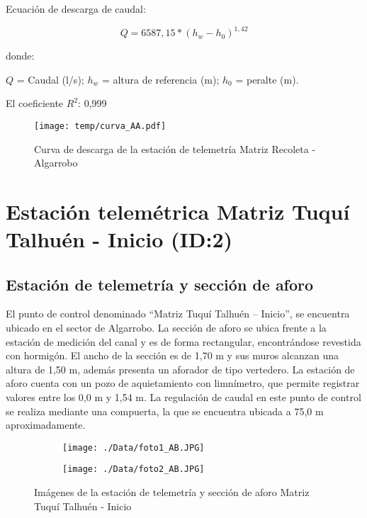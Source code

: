 \documentclass[]{article}
\begin{document}
Ecuación de descarga de caudal:

\[Q = 6587,15*(h_w - h_0)^{1,42}\]

donde:

\(Q\) = Caudal (l/s); \(h_w\) = altura de referencia (m); \(h_0\) =
peralte (m).

El coeficiente \(R^2\): 0,999

\begin{figure}[H]
  \centering
  \texttt{[image: temp/curva\_AA.pdf]}
\caption{Curva de descarga de la estación de telemetría Matriz Recoleta - Algarrobo}
\label{fig:Curva_AA}
\end{figure}

\clearpage
\section{Estación telemétrica Matriz Tuquí Talhuén - Inicio (ID:2)}

\subsection{Estación de telemetría y sección de aforo}

El punto de control denominado ``Matriz Tuquí Talhuén – Inicio'', se encuentra ubicado en el sector de Algarrobo. La sección de aforo se ubica frente a la estación de medición del canal y es de forma rectangular, encontrándose revestida con hormigón. El ancho de la sección es de 1,70 m y sus muros alcanzan una altura de 1,50 m, además presenta un aforador de tipo vertedero. La estación de aforo cuenta con un pozo de aquietamiento con limnímetro, que permite registrar valores entre los 0,0 m y 1,54 m. La regulación de caudal en este punto de control se realiza mediante una compuerta, la que se encuentra ubicada a 75,0 m aproximadamente.

\begin{figure}[H]
  \centering
\begin{subfigure}{.49\textwidth}
  \texttt{[image: ./Data/foto1\_AB.JPG]}
\end{subfigure}
\hfill
\begin{subfigure}{.49\textwidth}
  \texttt{[image: ./Data/foto2\_AB.JPG]}
\end{subfigure}
\caption{Imágenes de la estación de telemetría y sección de aforo Matriz Tuquí Talhuén - Inicio}
\label{fig:fotos_2}
\end{figure}
\end{document}
